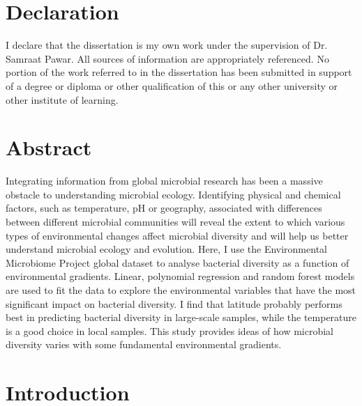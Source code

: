\documentclass[11pt, a4paper]{article}
\begin{document}
\begin{spacing}{1.5}


\section*{Declaration}

I declare that the dissertation is my own work under the supervision of Dr. Samraat Pawar. All sources of information are appropriately referenced. No portion of the work referred to in the dissertation has been submitted in support of a degree or diploma or other qualification of this or any other university or other institute of learning. 

\clearpage

\section*{Abstract}

Integrating information from global microbial research has been a massive obstacle to understanding microbial ecology. Identifying physical and chemical factors, such as temperature, pH or geography, associated with differences between different microbial communities will reveal the extent to which various types of environmental changes affect microbial diversity and will help us better understand microbial ecology and evolution. Here, I use the Environmental Microbiome Project global dataset to analyse bacterial diversity as a function of environmental gradients. Linear, polynomial regression and random forest models are used to fit the data to explore the environmental variables that have the most significant impact on bacterial diversity. I find that latitude probably performs best in predicting bacterial diversity in large-scale samples, while the temperature is a good choice in local samples. This study provides ideas of how microbial diversity varies with some fundamental environmental gradients. 

\clearpage

\tableofcontents 
\clearpage

\linenumbers
\renewcommand\thesection{\arabic{section}}
\section{Introduction}


\end{spacing}
\end{document}
